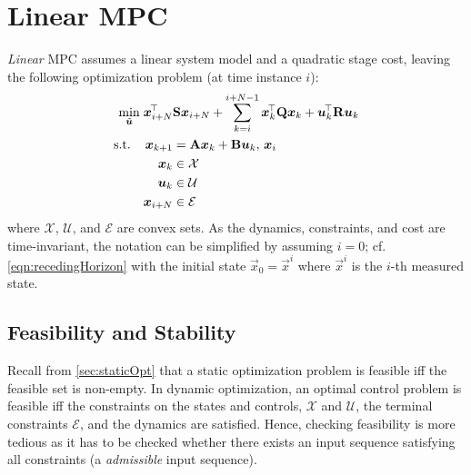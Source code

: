 	\section{Linear MPC}
		\emph{Linear} MPC assumes a linear system model and a quadratic stage cost, leaving the following optimization problem (at time instance \(i\)):
		\begin{equation}
			\begin{aligned}
				\min_{\tilde{\bm{u}}}\; & \bm{x}_{i + N}^{\!\top} \bm{\mathrm{S}} \bm{x}_{i + N} + \sum_{k = i}^{i + N - 1} \bm{x}_k^{\!\top} \bm{\mathrm{Q}} \bm{x}_k + \bm{u}_k^{\!\top} \bm{\mathrm{R}} \bm{u}_k \\
				\text{s.t.}\quad &
					\begin{aligned}[t]
						\bm{x}_{k + 1} &= \bm{\mathrm{A}} \bm{x}_k + \bm{\mathrm{B}} \bm{u}_k,\, \bm{x}_i \\
						\bm{x}_k &\in \mathcal{X} \\
						\bm{u}_k &\in \mathcal{U} \\
						\bm{x}_{i + N} &\in \mathcal{E}
					\end{aligned}
			\end{aligned}
			\label{eqn:linearRecedingHorizon}
		\end{equation}
		where \(\mathcal{X}\), \(\mathcal{U}\), and \(\mathcal{E}\) are convex sets. As the dynamics, constraints, and cost are time-invariant, the notation can be simplified by assuming \(i = 0\); cf. \eqref{eqn:recedingHorizon} with the initial state \(\vec{x}_0 = \vec{x}^i\) where \(\vec{x}^i\) is the \(i\)-th measured state.

		\subsection{Feasibility and Stability}
			Recall from \autoref{sec:staticOpt} that a static optimization problem is feasible iff the feasible set is non-empty. In dynamic optimization, an optimal control problem is feasible iff the constraints on the states and controls, \(\mathcal{X}\) and \(\mathcal{U}\), the terminal constraints \(\mathcal{E}\), and the dynamics are satisfied. Hence, checking feasibility is more tedious as it has to be checked whether there exists an input sequence satisfying all constraints (a \emph{admissible} input sequence).

